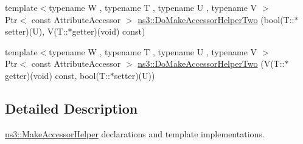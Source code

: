 \begin{DoxyCompactItemize}
\item 
{\footnotesize template$<$typename W , typename T , typename U , typename V $>$ }\\Ptr$<$ const Attribute\+Accessor $>$ \hyperlink{group__attributeimpl_ga2dd52d53891974b5e2454e1c5646f79f}{ns3\+::\+Do\+Make\+Accessor\+Helper\+Two} (bool(T\+::$\ast$setter)(U), V(T\+::$\ast$getter)(void) const)
\item 
{\footnotesize template$<$typename W , typename T , typename U , typename V $>$ }\\Ptr$<$ const Attribute\+Accessor $>$ \hyperlink{group__attributeimpl_ga157002a9f8cf399e6a2576a3b03f2252}{ns3\+::\+Do\+Make\+Accessor\+Helper\+Two} (V(T\+::$\ast$getter)(void) const, bool(T\+::$\ast$setter)(U))
\end{DoxyCompactItemize}


\subsection{Detailed Description}
\hyperlink{group__attributeimpl_ga9fcb2910982e978ae6ee07b2909bfe2e}{ns3\+::\+Make\+Accessor\+Helper} declarations and template implementations. 